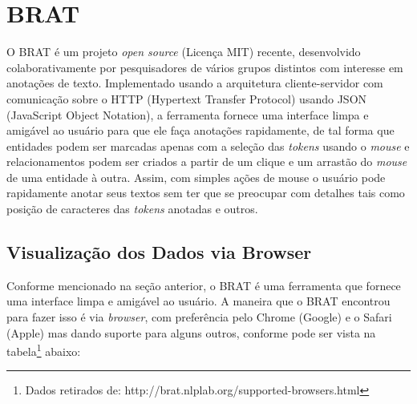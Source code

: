 \documentclass[11pt]{report}
\begin{document}
\section{BRAT}

\indent\indent O BRAT é um projeto \textit{open source} (Licença MIT) recente, desenvolvido colaborativamente por pesquisadores de vários grupos distintos com interesse em
anotações de texto. Implementado usando a arquitetura cliente-servidor com comunicação sobre o HTTP (Hypertext Transfer Protocol) usando JSON (JavaScript Object Notation), a
ferramenta fornece uma interface limpa e amigável ao usuário para que ele faça anotações rapidamente, de tal forma que
entidades podem ser marcadas apenas com a seleção das \textit{tokens} usando o \textit{mouse} e relacionamentos podem ser criados a partir de um clique e um arrastão do
\textit{mouse} de uma entidade à outra. Assim, com simples ações de mouse o usuário pode rapidamente anotar seus textos sem ter que se preocupar com detalhes tais como
posição de caracteres das \textit{tokens} anotadas e outros.

\subsection{Visualização dos Dados via Browser}

\indent\indent Conforme mencionado na seção anterior, o BRAT é uma ferramenta que fornece uma interface limpa e amigável ao usuário. A maneira que o BRAT encontrou para fazer isso
é via \textit{browser}, com preferência pelo Chrome (Google) e o Safari (Apple) mas dando suporte para alguns outros, conforme pode ser vista na
tabela\footnote[10]{Dados retirados de: http://brat.nlplab.org/supported-browsers.html} abaixo:
\end{document}
